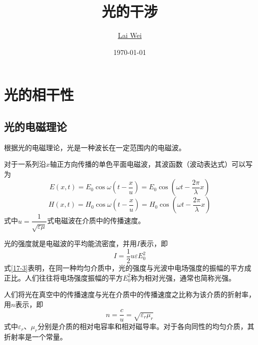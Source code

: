 \documentclass[12pt]{article}
\title{光的干涉}
\author{\href{mailto:lai-wei@whu.edu.cn}{Lai Wei}}
\date{\today}
\begin{document}
\maketitle

\section{光的相干性}

\subsection{光的电磁理论}

根据光的电磁理论，光是一种波长在一定范围内的电磁波。

对于一系列沿\(x\)轴正方向传播的单色平面电磁波，其波函数（波动表达式）可以写为
\begin{equation}
E(x, t)=E_0 \cos \omega\left(t-\frac{x}{u}\right)=E_0 \cos \left(\omega t-\frac{2 \pi}{\lambda} x\right)
\end{equation}
\begin{equation}
H(x, t)=H_0 \cos \omega\left(t-\frac{x}{u}\right)=H_0 \cos \left(\omega t-\frac{2 \pi}{\lambda} x\right)
\end{equation}
式中\(u = \dfrac{1}{\sqrt{\varepsilon \mu}}\)式电磁波在介质中的传播速度。

光的强度就是电磁波的平均能流密度，并用\(I\)表示，即
\begin{equation}
I=\frac{1}{2} u \varepsilon E_0^2
\label{17-3}
\end{equation}
式\ref{17-3}表明，在同一种均匀介质中，光的强度与光波中电场强度的振幅的平方成正比。人们往往将电场强度振幅的平方\(E_0^2\)称为相对光强，通常也简称光强。

人们将光在真空中的传播速度与光在介质中的传播速度之比称为该介质的折射率，用\(n\)表示，即
\begin{equation}
    n = \frac{c}{u} = \sqrt{\varepsilon_r \mu_r}
\end{equation}
式中\(\varepsilon_r\)、\(\mu_r\)分别是介质的相对电容率和相对磁导率。对于各向同性的均匀介质，其折射率是一个常量。
\end{document}
